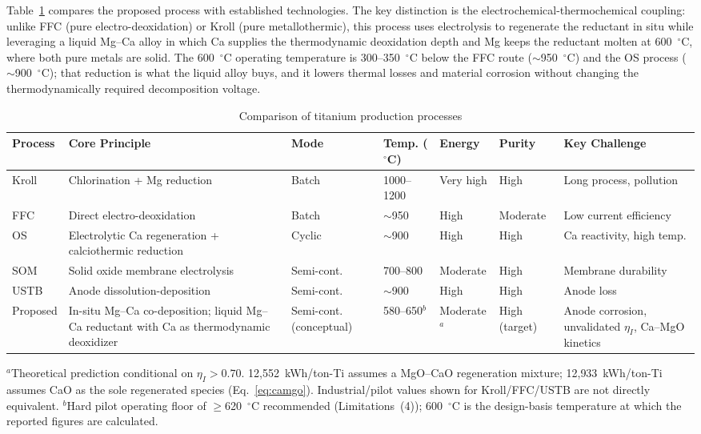 \documentclass[11pt]{article}
\begin{document}
Table~\ref{tab:compare} compares the proposed process with established technologies. The key distinction is the electrochemical-thermochemical coupling: unlike FFC (pure electro-deoxidation) or Kroll (pure metallothermic), this process uses electrolysis to regenerate the reductant in situ while leveraging a liquid Mg--Ca alloy in which Ca supplies the thermodynamic deoxidation depth and Mg keeps the reductant molten at 600~$^{\circ}$C, where both pure metals are solid. The 600~$^{\circ}$C operating temperature is 300--350~$^{\circ}$C below the FFC route ($\sim$950~$^{\circ}$C) and the OS process ($\sim$900~$^{\circ}$C); that reduction is what the liquid alloy buys, and it lowers thermal losses and material corrosion without changing the thermodynamically required decomposition voltage.

\begin{table}[!ht]
  \centering
  \caption{Comparison of titanium production processes}
  \label{tab:compare}
  \footnotesize
  \setlength{\tabcolsep}{3pt}
  \begin{tabularx}{\linewidth}{@{} p{1.5cm} p{2.5cm} p{1.4cm} p{1.2cm} p{1.4cm} p{1.3cm} X @{}}
  \toprule
  Process & Core Principle & Mode & Temp. ($^{\circ}$C) & Energy & Purity & Key Challenge \\
  \midrule
  Kroll & Chlorination + Mg reduction & Batch & 1000--1200 & Very high & High & Long process, pollution \\
  FFC & Direct electro-deoxidation & Batch & $\sim$950 & High & Moderate & Low current efficiency \\
  OS & Electrolytic Ca regeneration + calciothermic reduction & Cyclic & $\sim$900 & High & High & Ca reactivity, high temp. \\
  SOM & Solid oxide membrane electrolysis & Semi-cont. & 700--800 & Moderate & High & Membrane durability \\
  USTB & Anode dissolution-deposition & Semi-cont. & $\sim$900 & High & High & Anode loss \\
  Proposed & In-situ Mg--Ca co-deposition; liquid Mg--Ca reductant with Ca as thermodynamic deoxidizer & Semi-cont. (conceptual) & 580--650$^{b}$ & Moderate$^{a}$ & High (target) & Anode corrosion, unvalidated $\eta_I$, Ca--MgO kinetics \\
  \bottomrule
  \end{tabularx}
  \par\vspace{2pt}
  \footnotesize $^{a}$Theoretical prediction conditional on $\eta_I > 0.70$. 12{,}552~kWh/ton-Ti assumes a MgO--CaO regeneration mixture; 12{,}933~kWh/ton-Ti assumes CaO as the sole regenerated species (Eq.~\ref{eq:camgo}). Industrial/pilot values shown for Kroll/FFC/USTB are not directly equivalent.
  $^{b}$Hard pilot operating floor of $\geq$620~$^{\circ}$C recommended (Limitations~(4)); 600~$^{\circ}$C is the design-basis temperature at which the reported figures are calculated.
\end{table}
\end{document}
